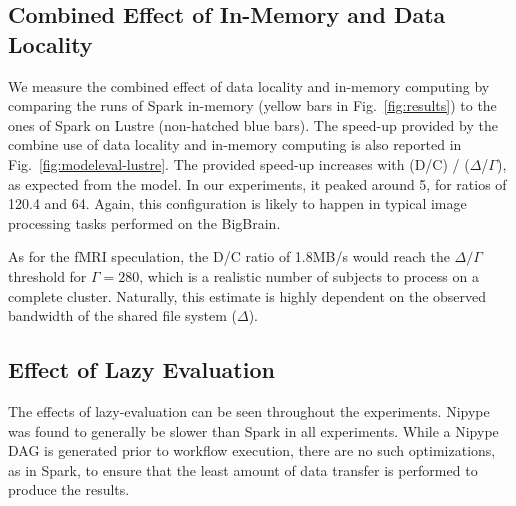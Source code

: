 \documentclass{IEEEtran}
\newcommand{\todo}[1]{\marginpar{\parbox{18mm}{\flushleft\tiny\color{red}\textbf{TODO}:
      #1}}}
\begin{document}

\subsection{Combined Effect of In-Memory and Data Locality}
We measure the combined effect of data locality and in-memory computing 
by comparing the runs of Spark in-memory (yellow bars in 
Fig.~\ref{fig:results}) to the ones of Spark on Lustre (non-hatched 
blue bars). The speed-up provided by the combine use of data locality 
and in-memory computing is also reported in 
Fig.~\ref{fig:modeleval-lustre}. The provided speed-up increases with 
(D/C) / ($\Delta$/$\Gamma$), as expected from the model. In our 
experiments, it peaked around 5, for ratios of 120.4 and 64. Again, 
this configuration is likely to happen in typical image processing 
tasks performed on the BigBrain.

As for the fMRI speculation, the D/C 
ratio of 1.8MB/s would reach the $\Delta/\Gamma$ threshold for 
$\Gamma=280$, which is a realistic number of subjects to process on a 
complete cluster. Naturally, this estimate is highly dependent on the observed bandwidth
of the shared file system ($\Delta$).

\subsection{Effect of Lazy Evaluation}

The effects of lazy-evaluation can be seen throughout the experiments. Nipype 
was found to generally be slower than Spark in all experiments. While a Nipype DAG is 
generated prior to workflow execution, there are no such optimizations, as in 
Spark, to ensure that the least amount of data transfer is performed to produce the 
results. 
\end{document}
